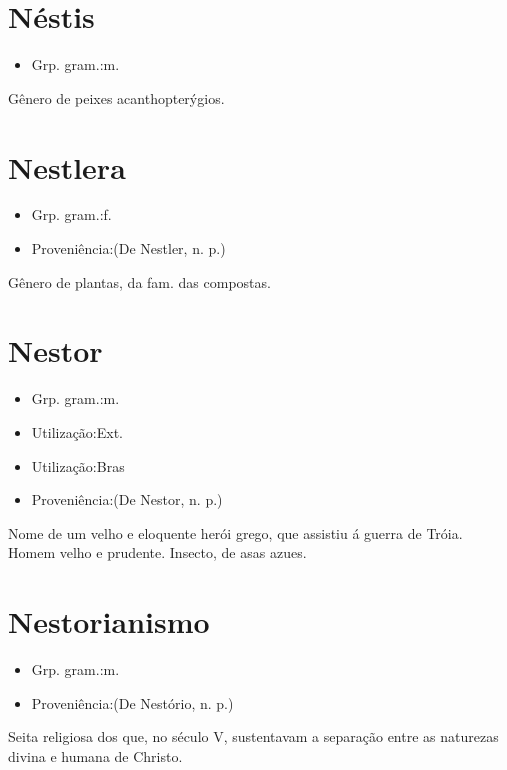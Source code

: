 \section{Néstis}
\begin{itemize}
\item {Grp. gram.:m.}
\end{itemize}
Gênero de peixes acanthopterýgios.
\section{Nestlera}
\begin{itemize}
\item {Grp. gram.:f.}
\end{itemize}
\begin{itemize}
\item {Proveniência:(De \textunderscore Nestler\textunderscore , n. p.)}
\end{itemize}
Gênero de plantas, da fam. das compostas.
\section{Nestor}
\begin{itemize}
\item {Grp. gram.:m.}
\end{itemize}
\begin{itemize}
\item {Utilização:Ext.}
\end{itemize}
\begin{itemize}
\item {Utilização:Bras}
\end{itemize}
\begin{itemize}
\item {Proveniência:(De \textunderscore Nestor\textunderscore , n. p.)}
\end{itemize}
Nome de um velho e eloquente herói grego, que assistiu á guerra de Tróia.
Homem velho e prudente.
Insecto, de asas azues.
\section{Nestorianismo}
\begin{itemize}
\item {Grp. gram.:m.}
\end{itemize}
\begin{itemize}
\item {Proveniência:(De \textunderscore Nestório\textunderscore , n. p.)}
\end{itemize}
Seita religiosa dos que, no século V, sustentavam a separação entre as naturezas divina e humana de Christo.

